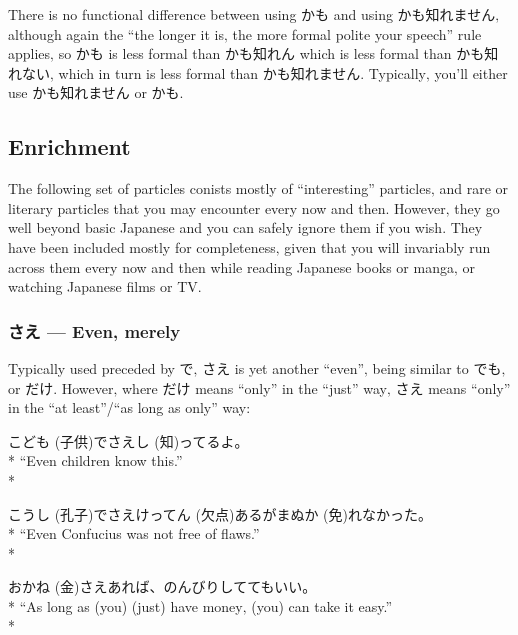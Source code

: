 \documentclass[11pt, b5paper, twoside, openright, onecolumn]{book}
\makeatletter
\newcommand*{\rubystack}[2]{{\relscale{0.5}%
  \begin{tabular}[b]{@{}c@{}}%
    {#1}\\%
   {\textscale{2}{#2}}%
  \end{tabular}}%
}
\DeclareRobustCommand*{\ruby}[2]{%
  \mbox{%
    \setlength{\parskip}{0ex}%
    \BeginAccSupp{method=pdfstringdef,ActualText={#1}}%
      \rubystack{\phantom{#2}}{#1}%
      \llap{%
        \rubystack{#2}{\phantom{#1}}%
      }%
    \EndAccSupp{}%
  }%
}
\renewcommand*{\ruby}[2]{#2 (#1)}%
\newenvironment{exampleblock}{
\setlength{\parindent}{0.6in}
\begin{minipage}[t]{\dimexpr\textwidth-\parindent}}
{\end{minipage}}
\makeatother
\begin{document}
There is no functional difference between using かも and using かも知れません‚ although again the “the longer it is‚ the more formal polite your speech” rule applies‚ so かも is less formal than かも知れん which is less formal than かも知れない‚ which in turn is less formal than かも知れません. Typically‚ you’ll either use かも知れません or かも.

\subsection{Enrichment}

The following set of particles conists mostly of “interesting” particles‚ and rare or literary particles that you may encounter every now and then. However‚ they go well beyond basic Japanese and you can safely ignore them if you wish. They have been included mostly for completeness‚ given that you will invariably run across them every now and then while reading Japanese books or manga‚ or watching Japanese films or TV.

\subsubsection{さえ — Even‚ merely}

Typically used preceded by で‚ さえ is yet another “even”‚ being similar to でも‚ or だけ. However‚ where だけ means “only” in the “just” way‚ さえ means “only” in the “at least”/“as long as only” way:

\vspace{0.4cm}
\begin{exampleblock}
\ruby{子供}{こども}でさえ\ruby{知}{し}ってるよ。 \\* 
“Even children know this.” \\* 
\end{exampleblock}
\vspace{0.2cm}

\begin{exampleblock}
\ruby{孔子}{こうし}でさえ\ruby{欠点}{けってん}あるが\ruby{免}{まぬか}れなかった。 \\* 
“Even Confucius was not free of flaws.” \\* 
\end{exampleblock}
\vspace{0.2cm}

\begin{exampleblock}
お\ruby{金}{かね}さえあれば、のんびりしててもいい。 \\* 
“As long as (you) (just) have money‚ (you) can take it easy.” \\* 
\end{exampleblock}
\end{document}
